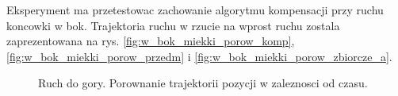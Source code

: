 Eksperyment ma przetestowac zachowanie algorytmu kompensacji przy ruchu koncowki w bok. Trajektoria ruchu w rzucie na wprost ruchu zostala zaprezentowana na rys. \ref{fig:w_bok_miekki_porow_komp}, \ref{fig:w_bok_miekki_porow_przedm} i \ref{fig:w_bok_miekki_porow_zbiorcze_a}. 
\begin{figure}[h]
	\centering
	\hfill
	
	\hfill

	\caption{Ruch do gory. Porownanie trajektorii pozycji w zaleznosci od czasu.}
	\label{fig:w_bok_miekki_a}

\end{figure}


